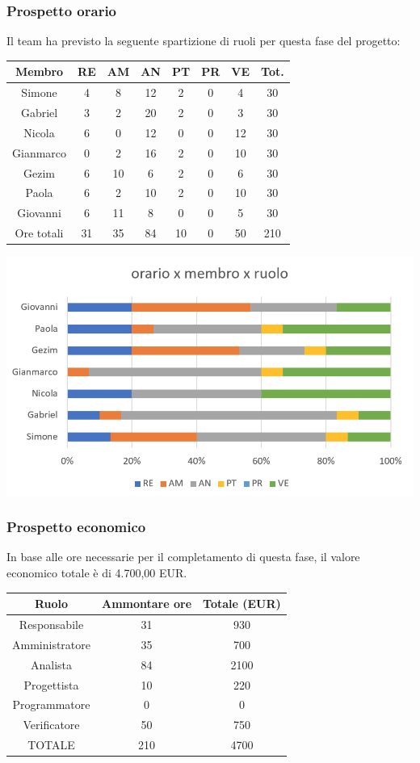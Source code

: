 \subsubsection{Prospetto orario}
Il team ha previsto la seguente spartizione di ruoli per questa fase del progetto:\\
\begin{center}
\begin{tabular}{ |c|c|c|c|c|c|c|c|  }
 \hline
 Membro 		& RE 	& AM 	& AN 	& PT 	& PR 	& VE 	& Tot.\\
 \hline\hline
 Simone			& 4 		& 8		& 12 	& 2 		& 0 		& 4 		& 30\\
 Gabriel		& 3 		& 2 		& 20 	& 2 		& 0 		& 3 		& 30\\
 Nicola			& 6 		& 0 		& 12 	& 0 		& 0 		& 12 	& 30\\
 Gianmarco		& 0 		& 2 		& 16 	& 2 		& 0 		& 10 	& 30\\
 Gezim			& 6 		& 10 	& 6 	& 2 		& 0 		& 6	 	& 30\\
 Paola			& 6 		& 2 		& 10 	& 2 		& 0 		& 10 	& 30\\
 Giovanni		& 6 		& 11 	& 8 	& 0 		& 0 		& 5  	& 30\\
 \hline\hline
 Ore totali		& 31		& 35		& 84 	& 10 	& 0 		& 50 	& 210\\
  \hline
\end{tabular}
\end{center}
\includegraphics[width=\textwidth]{res/img/h12}
\subsubsection{Prospetto economico}
In base alle ore necessarie per il completamento di questa fase, il valore economico totale è di 4.700,00 EUR.
\begin{center}
\begin{tabular}{ |c|c|c|  }
 \hline
 Ruolo 		& Ammontare ore 	& Totale (EUR)\\
 	\hline
 \hline
 	Responsabile	& 31 	& 930\\
	Amministratore	& 35		& 700\\
	Analista		& 84 	& 2100\\
	Progettista		& 10		& 220\\
	Programmatore	& 0		& 0\\
	Verificatore	& 50		& 750\\
 \hline\hline
 TOTALE		& 210		& 4700\\
  \hline
\end{tabular}
\end{center}
\newpage
